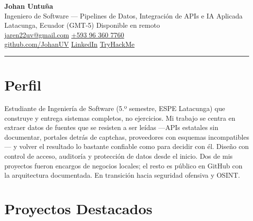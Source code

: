 \documentclass[10.5pt,a4paper]{article}
\begin{document}
{\Huge\bfseries Johan Untuña}\\[0.35em]
{\large\color{muted} Ingeniero de Software --- Pipelines de Datos, Integración de APIs e IA Aplicada}\\[0.7em]
{\small
Latacunga, Ecuador (GMT-5) \textbullet{} Disponible en remoto \\
\href{mailto:jaren22uv@gmail.com}{jaren22uv@gmail.com} \textbullet{}
\href{https://wa.me/593963607760}{+593 96 360 7760} \\
\href{https://github.com/JohanUV}{github.com/JohanUV} \textbullet{}
\href{https://www.linkedin.com/in/jaren-untu\%C3\%B1a-valiente-762799211/}{LinkedIn} \textbullet{}
\href{https://tryhackme.com/p/jaren22uv}{TryHackMe}
}

\vspace{0.45em}
{\color{ink}\rule{\linewidth}{1.1pt}}

\section*{Perfil}
Estudiante de Ingeniería de Software (5.º semestre, ESPE Latacunga) que construye y entrega
sistemas completos, no ejercicios. Mi trabajo se centra en extraer datos de fuentes que se
resisten a ser leídas ---APIs estatales sin documentar, portales detrás de captchas, proveedores
con esquemas incompatibles--- y volver el resultado lo bastante confiable como para decidir con
él. Diseño con control de acceso, auditoría y protección de datos desde el inicio. Dos de mis
proyectos fueron encargos de negocios locales; el resto es público en GitHub con la
arquitectura documentada. En transición hacia seguridad ofensiva y OSINT.

\section*{Proyectos Destacados}
\end{document}

